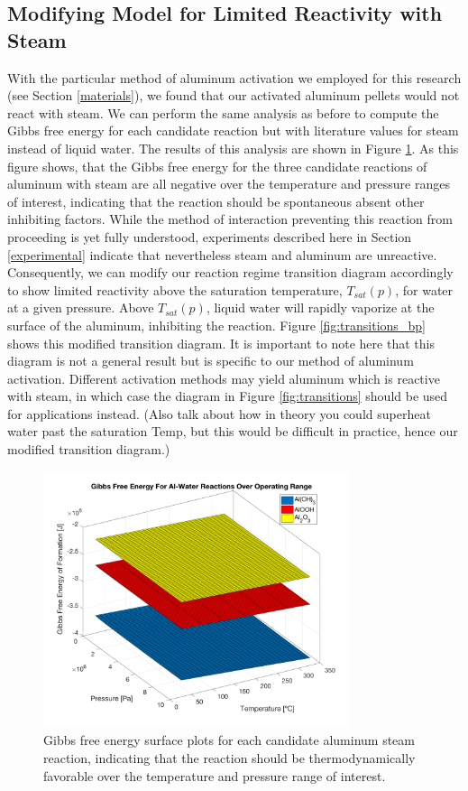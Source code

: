 \documentclass[preprint,12pt,3p]{elsarticle}
\begin{document}
\subsection{Modifying Model for Limited Reactivity with Steam}

With the particular method of aluminum activation we employed for this research
(see Section \ref{materials}), we found that our activated aluminum pellets
would not react with steam. We can perform the same analysis as before to
compute the Gibbs free energy for each candidate reaction but with literature
values for steam instead of liquid water. The results of this analysis are shown
in Figure \ref{fig:gibbs_steam_surface}. As this figure shows, that the Gibbs
free energy for the three candidate reactions of aluminum with steam are all
negative over the temperature and pressure ranges of interest, indicating that
the reaction should be spontaneous absent other inhibiting factors. While the
method of interaction preventing this reaction from proceeding is yet fully
understood, experiments described here in Section \ref{experimental} indicate
that nevertheless steam and aluminum are unreactive. Consequently, we can modify
our reaction regime transition diagram accordingly to show limited reactivity
above the saturation temperature, $T_{sat}(p)$, for water at a given pressure.
Above $T_{sat}(p)$, liquid water will rapidly vaporize at the surface of the
aluminum, inhibiting the reaction. Figure \ref{fig:transitions_bp} shows this
modified transition diagram. It is important to note here that this diagram is
not a general result but is specific to our method of aluminum activation.
Different activation methods may yield aluminum which is reactive with steam, in
which case the diagram in Figure \ref{fig:transitions} should be used for
applications instead. (Also talk about how in theory you could superheat water
past the saturation Temp, but this would be difficult in practice, hence our
modified transition diagram.)

\begin{figure}
  \centering
  \includegraphics[width=0.8\textwidth]{fig/gibbs_steam_total_surface}
  \caption{Gibbs free energy surface plots for each candidate aluminum steam
  reaction, indicating that the reaction should be thermodynamically favorable
over the temperature and pressure range of interest.}
  \label{fig:gibbs_steam_surface}
\end{figure}
\end{document}
